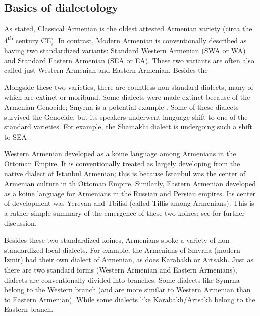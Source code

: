 \subsection{Basics of dialectology}

As stated, Classical Armenian is the oldest attested Armenian variety (circa the 4\textsuperscript{th} century CE). In contrast, Modern Armenian    is conventionally described as having two standardized variants: Standard Western Armenian (SWA or WA) and Standard Eastern Armenian (SEA or EA). These two variants are often also called just Western Armenian and Eastern Armenian. Besides the 

Alongside these two varieties, there are countless non-standard dialects, many of which are extinct or moribund. Some dialects were made extinct because of the Armenian Genocide; Smyrna is a potential example \citep{Vaux-2012-ArmenianSmyrna}. Some of these dialects survived the Genocide, but its speakers underwent language shift to one of the  standard varieties. For example, the Shamakhi dialect is undergoing such a shift to SEA \citep{Vlasyan-2019-Shamakhi}. 





Western Armenian developed as a koine language among  Armenians in the Ottoman Empire. It is conventionally treated as largely developing from the native dialect of Istanbul Armenian; this is because Istanbul was the center of Armenian culture in th Ottoman Empire. Similarly, Eastern Armenian developed as a koine language for Armenians in the Russian and Persian empires. Its center of development was Yerevan and Tbilisi  (called Tiflis among Armenians). This is a rather simple summary of the emergence of these two koines; see \citet{SayeedVaux-2017-EvolutionArmenian} for further discussion. 


Besides these two standardized koines, Armenians spoke a variety of non-standardized local dialects. For example, the Armenians of Smyrna (modern Izmir) had their own dialect of Armenian, as does Karabakh or Artsakh.  Just as there are two standard forms (Western Armenian and Eastern Armenians), dialects are conventionally divided into branches. Some dialects like Symrna belong to the Western branch (and are more similar to Western Armenian than to Eastern Armenian). While some dialects like Karabakh/Artsakh belong to the Eastern branch. 



